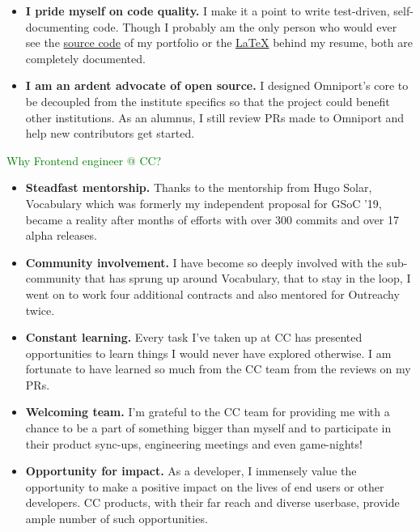 \begin{itemize}[nosep, parsep=1mm, leftmargin=*]
  \item \textbf{I pride myself on code quality.} I make it a point to write
  test-driven, self-documenting code. Though I probably am the only person who
  would ever see the \href{https://github.com/dhruvkb/portfolio/}{source code}
  of my portfolio or the
  \href{https://github.com/dhruvkb/resume/}{\selectfont\LaTeX}
  behind my resume, both are completely documented.

  \item \textbf{I am an ardent advocate of open source.} I designed Omniport's
  core to be decoupled from the institute specifics so that the project could
  benefit other institutions. As an alumnus, I still review PRs made to Omniport
  and help new contributors get started.
\end{itemize}

\textcolor{green}{Why Frontend engineer @ CC?} 
\begin{itemize}[nosep, parsep=1mm, leftmargin=*]
  \item \textbf{Steadfast mentorship.} Thanks to the mentorship from Hugo Solar,
  Vocabulary which was formerly my independent proposal for GSoC '19, became a
  reality after months of efforts with over 300 commits and over 17 alpha
  releases.

  \item \textbf{Community involvement.} I have become so deeply involved with
  the sub-community that has sprung up around Vocabulary, that to stay in the
  loop, I went on to work four additional contracts and also mentored for
  Outreachy twice.

  \item \textbf{Constant learning.} Every task I've taken up at CC has presented
  opportunities to learn things I would never have explored otherwise. I am
  fortunate to have learned so much from the CC team from the reviews on my PRs.

  \item \textbf{Welcoming team.} I'm grateful to the CC team for providing me
  with a chance to be a part of something bigger than myself and to participate
  in their product sync-ups, engineering meetings and even game-nights!

  \item \textbf{Opportunity for impact.} As a developer, I immensely value the
  opportunity to make a positive impact on the lives of end users or other
  developers. CC products, with their far reach and diverse userbase, provide
  ample number of such opportunities.
\end{itemize}


